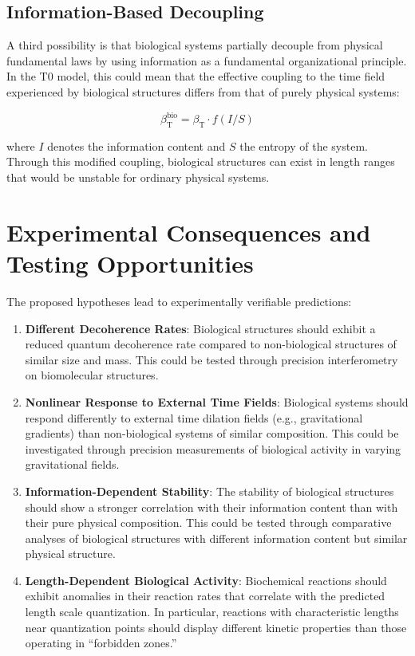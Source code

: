 \documentclass[12pt,a4paper]{article}
\newcommand{\betaT}{\beta_{\text{T}}}
\begin{document}
	\subsection{Information-Based Decoupling}
	
	A third possibility is that biological systems partially decouple from physical fundamental laws by using information as a fundamental organizational principle. In the T0 model, this could mean that the effective coupling to the time field experienced by biological structures differs from that of purely physical systems:
	
	\begin{equation}
		\betaT^{\text{bio}} = \betaT \cdot f(I/S)
	\end{equation}
	
	where $I$ denotes the information content and $S$ the entropy of the system. Through this modified coupling, biological structures can exist in length ranges that would be unstable for ordinary physical systems.
	
	\section{Experimental Consequences and Testing Opportunities}
	
	The proposed hypotheses lead to experimentally verifiable predictions:
	
	\begin{enumerate}
		\item \textbf{Different Decoherence Rates}: Biological structures should exhibit a reduced quantum decoherence rate compared to non-biological structures of similar size and mass. This could be tested through precision interferometry on biomolecular structures.
		
		\item \textbf{Nonlinear Response to External Time Fields}: Biological systems should respond differently to external time dilation fields (e.g., gravitational gradients) than non-biological systems of similar composition. This could be investigated through precision measurements of biological activity in varying gravitational fields.
		
		\item \textbf{Information-Dependent Stability}: The stability of biological structures should show a stronger correlation with their information content than with their pure physical composition. This could be tested through comparative analyses of biological structures with different information content but similar physical structure.
		
		\item \textbf{Length-Dependent Biological Activity}: Biochemical reactions should exhibit anomalies in their reaction rates that correlate with the predicted length scale quantization. In particular, reactions with characteristic lengths near quantization points should display different kinetic properties than those operating in ``forbidden zones.''
	\end{enumerate}
	
\end{document}
